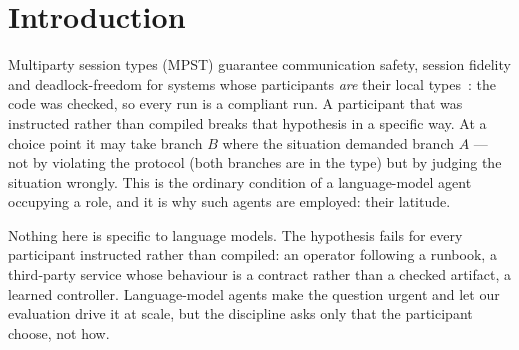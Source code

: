 \documentclass[a4paper,UKenglish,cleveref,autoref,thm-restate,anonymous]{lipics-v2021}
\newcommand{\Cat}{\textsf{Catastrophic}}
\begin{document}
\begin{abstract}
The evaluation asks whether any of this matters to a real agent. On eighteen protocols
ported from public agent configurations and customer-service policies, each pre-registered
before the tool ran, every verdict matched the expectation and every protocol is $0$-tolerant,
for one reason: its points of no return sit behind rules the policy states and no tool
enforces. Moving those rules into tool preconditions, where a tool can check them, makes $9$ of
the $18$ tolerant at every tested budget; in the other $9$ the rule left is a user confirmation
that no tool can check, and the analysis' narrowing repair makes all $18$ tolerant. In $3500$ runs of two models of one
vendor, agents shown true facts entered a \Cat{} branch of the real protocols in $68$ of $720$
runs, and in none behind a gate built from the classification; agents told by a requester
that every precondition held completed a catastrophe in $53$ of $180$ runs, and in none behind
the gate. A third, larger model, kept apart because it answered $1481$ of its $1750$ runs itself,
entered no \Cat{} branch with true facts and completed a catastrophe in $33$ of $61$ ungated
misinformed runs on the real protocols, and in none behind the gate. The limits are plain: on our own seventeen protocols, with true facts, no agent erred
at all, and the false note is a stress condition of our making.
\end{abstract}


\section{Introduction}\label{sec:intro}

Multiparty session types (MPST) guarantee communication safety, session
fidelity and deadlock-freedom for systems whose participants \emph{are} their
local types~\cite{honda-mpst}: the code was checked, so every run is a
compliant run. A participant that was instructed rather than compiled breaks
that hypothesis in a specific way. At a choice point it may take branch $B$
where the situation demanded branch $A$ --- not by violating the protocol
(both branches are in the type) but by judging the situation wrongly. This is
the ordinary condition of a language-model agent occupying a role, and it is
why such agents are employed: their latitude.

Nothing here is specific to language models. The hypothesis fails for every
participant instructed rather than compiled: an operator following a runbook, a
third-party service whose behaviour is a contract rather than a checked
artifact, a learned controller. Language-model agents make the question urgent
and let our evaluation drive it at scale, but the discipline asks only that the
participant choose, not how.
\end{document}
